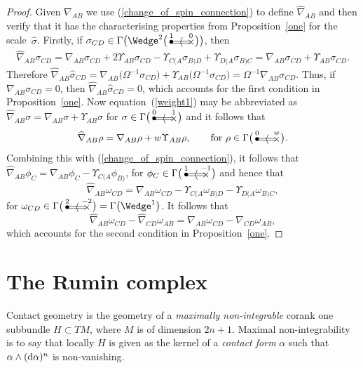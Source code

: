 \documentclass[10pt,a4paper]{amsart}
\numberwithin{equation}{section}
\newcommand{\btwo}[2]{\begin{picture}(28,11)
\put(4,1.5){\makebox(0,0){$\bullet$}}
\put(24,1.5){\makebox(0,0){$\times$}}
\put(23,2.5){\line(-1,0){20}}
\put(23,0.5){\line(-1,0){20}}
\put(14,1.5){\makebox(0,0){$\langle$}}
\put(4,8){\makebox(0,0){$\scriptstyle #1$}}
\put(24,8){\makebox(0,0){$\scriptstyle #2$}}
\end{picture}}
\begin{document}
\begin{proof} Given $\nabla_{AB}$ we use (\ref{change_of_spin_connection}) to
define $\widehat\nabla_{AB}$ and then verify that it has the characterising
properties from Proposition~\ref{one} for the scale~$\widehat\sigma$. Firstly,
if $\sigma_{CD}\in\Gamma\big({\Wedge}^2\big(\btwo{1}{0}\big)\big)$, then
\begin{gather}\label{weight1}
\widehat\nabla_{AB}\sigma_{CD}=\nabla_{AB}\sigma_{CD}
+2\Upsilon_{AB}\sigma_{CD}-\Upsilon_{C(A}\sigma_{B)D}
+\Upsilon_{D(A}\sigma_{B)C}=\nabla_{AB}\sigma_{CD}
+\Upsilon_{AB}\sigma_{CD}.\!\!\!\!\!\end{gather}
Therefore $\widehat\nabla_{AB}\widehat\sigma_{CD}
=\nabla_{AB}\big(\Omega^{-1}\sigma_{CD}\big) +\Upsilon_{AB}\big(\Omega^{-1}\sigma_{CD}\big)
=\Omega^{-1}\nabla_{AB}\sigma_{CD}$. Thus, if
$\nabla_{AB}\sigma_{CD}=0$, then $\widehat\nabla_{AB}\widehat\sigma_{CD}=0$,
which accounts for the first condition in Proposition~\ref{one}. Now equation~(\ref{weight1}) may be abbreviated as
$\widehat\nabla_{AB}\sigma=\nabla_{AB}\sigma+\Upsilon_{AB}\sigma$ for
$\sigma\in\Gamma\big(\btwo{0}{1}\big)$ and it follows that
\[\widehat\nabla_{AB}\rho=\nabla_{AB}\rho+w\Upsilon_{AB}\rho,\qquad
\mbox{for}\ \rho\in\Gamma\big(\btwo{0}{w}\big).\]
Combining this with (\ref{change_of_spin_connection}), it follows
that $\widehat\nabla_{AB}\phi_C=\nabla_{AB}\phi_C-\Upsilon_{C(A}\phi_{B)}$,
for $\phi_C\in\Gamma\big(\btwo{1}{-1}\,\big)$ and hence that
\[\widehat\nabla_{AB}\omega_{CD}=\nabla_{AB}\omega_{CD}
-\Upsilon_{C(A}\omega_{B)D}-\Upsilon_{D(A}\omega_{B)C},\]
for $\omega_{CD}\in\Gamma\big(\btwo{2}{-2}\,\big)=\Gamma\big({\Wedge}^1\big)$. It follows that
\[\widehat\nabla_{AB}\omega_{CD}-\widehat\nabla_{CD}\omega_{AB}
=\nabla_{AB}\omega_{CD}-\nabla_{CD}\omega_{AB},\]
which accounts for the second condition in Proposition~\ref{one}.
\end{proof}

\section{The Rumin complex}\label{rumin}
Contact geometry is the geometry of a \textit{maximally non-integrable}
corank one subbundle $H\subset TM$, where $M$ is of dimension $2n+1$. Maximal
non-integrability is to say that locally $H$ is given as the kernel of a
\textit{contact form} $\alpha$ such that $\alpha \wedge ({\rm d}\alpha)^n$ is
non-vanishing.
\end{document}
